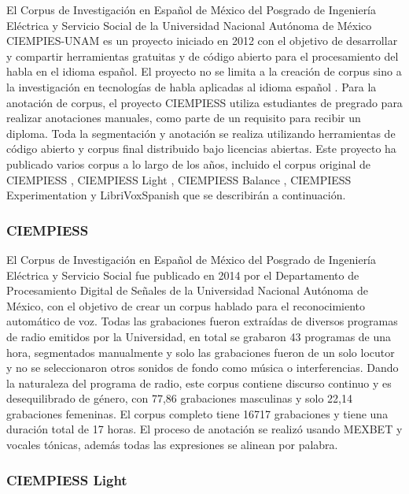 \documentclass[a4paper,12pt,twoside]{report}
\begin{document}
El Corpus de Investigación en Español de México del Posgrado de Ingeniería Eléctrica y Servicio Social de la Universidad Nacional Autónoma de México CIEMPIES-UNAM es un proyecto iniciado en 2012 con el objetivo de desarrollar y compartir herramientas gratuitas y de código abierto para el procesamiento del habla en el idioma español. El proyecto no se limita a la creación de corpus sino a la investigación en tecnologías de habla aplicadas al idioma español \cite{CIEMPIESS-Webpage}. Para la anotación de corpus, el proyecto CIEMPIESS utiliza estudiantes de pregrado para realizar anotaciones manuales, como parte de un requisito para recibir un diploma. Toda la segmentación y anotación se realiza utilizando herramientas de código abierto y corpus final distribuido bajo licencias abiertas. Este proyecto ha publicado varios corpus a lo largo de los años, incluido el corpus original de CIEMPIESS \cite {CIEMPIESS}, CIEMPIESS Light \cite {CIEMPIESS-LIGHT}, CIEMPIESS Balance \cite {CIEMPIESS-BALANCE}, CIEMPIESS Experimentation \cite {CIEMPIESS-Experimentation} y LibriVoxSpanish \cite {LibriVox-Spanish} que se describirán a continuación.

\subsubsection{CIEMPIESS}

El Corpus de Investigación en Español de México del Posgrado de Ingeniería Eléctrica y Servicio Social fue publicado en 2014 por el Departamento de Procesamiento Digital de Señales de la Universidad Nacional Autónoma de México, con el objetivo de crear un corpus hablado para el reconocimiento automático de voz. Todas las grabaciones fueron extraídas de diversos programas de radio emitidos por la Universidad, en total se grabaron 43 programas de una hora, segmentados manualmente y solo las grabaciones fueron de un solo locutor y no se seleccionaron otros sonidos de fondo como música o interferencias. Dando la naturaleza del programa de radio, este corpus contiene discurso continuo y es desequilibrado de género, con 77,86 grabaciones masculinas y solo 22,14 grabaciones femeninas. El corpus completo tiene 16717 grabaciones y tiene una duración total de 17 horas. El proceso de anotación se realizó usando MEXBET y vocales tónicas, además todas las expresiones se alinean por palabra.

\subsubsection{CIEMPIESS Light}
\end{document}
